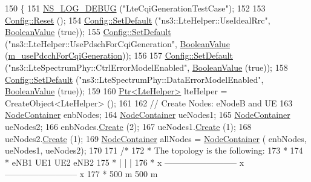 \begin{DoxyCode}
150 \{
151   \hyperlink{group__logging_ga413f1886406d49f59a6a0a89b77b4d0a}{NS\_LOG\_DEBUG} (\textcolor{stringliteral}{"LteCqiGenerationTestCase"});
152 
153   \hyperlink{group__config_ga2c1b65724f42f8c72276d7e7ad6df6db}{Config::Reset} ();
154   \hyperlink{group__config_ga2e7882df849d8ba4aaad31c934c40c06}{Config::SetDefault} (\textcolor{stringliteral}{"ns3::LteHelper::UseIdealRrc"}, 
      \hyperlink{classns3_1_1BooleanValue}{BooleanValue} (\textcolor{keyword}{true}));
155   \hyperlink{group__config_ga2e7882df849d8ba4aaad31c934c40c06}{Config::SetDefault} (\textcolor{stringliteral}{"ns3::LteHelper::UsePdschForCqiGeneration"}, 
      \hyperlink{classns3_1_1BooleanValue}{BooleanValue} (\hyperlink{classLteCqiGenerationTestCase_a12fc45be07ab23b3a9e0805dc867f80c}{m\_usePdcchForCqiGeneration}));
156 
157   \hyperlink{group__config_ga2e7882df849d8ba4aaad31c934c40c06}{Config::SetDefault} (\textcolor{stringliteral}{"ns3::LteSpectrumPhy::CtrlErrorModelEnabled"}, 
      \hyperlink{classns3_1_1BooleanValue}{BooleanValue} (\textcolor{keyword}{true}));
158   \hyperlink{group__config_ga2e7882df849d8ba4aaad31c934c40c06}{Config::SetDefault} (\textcolor{stringliteral}{"ns3::LteSpectrumPhy::DataErrorModelEnabled"}, 
      \hyperlink{classns3_1_1BooleanValue}{BooleanValue} (\textcolor{keyword}{true}));
159 
160   \hyperlink{classns3_1_1Ptr}{Ptr<LteHelper>} lteHelper = CreateObject<LteHelper> ();
161 
162   \textcolor{comment}{// Create Nodes: eNodeB and UE}
163   \hyperlink{classns3_1_1NodeContainer}{NodeContainer} enbNodes;
164   \hyperlink{classns3_1_1NodeContainer}{NodeContainer} ueNodes1;
165   \hyperlink{classns3_1_1NodeContainer}{NodeContainer} ueNodes2;
166   enbNodes.\hyperlink{classns3_1_1NodeContainer_a787f059e2813e8b951cc6914d11dfe69}{Create} (2);
167   ueNodes1.\hyperlink{classns3_1_1NodeContainer_a787f059e2813e8b951cc6914d11dfe69}{Create} (1);
168   ueNodes2.\hyperlink{classns3_1_1NodeContainer_a787f059e2813e8b951cc6914d11dfe69}{Create} (1);
169   \hyperlink{classns3_1_1NodeContainer}{NodeContainer} allNodes = \hyperlink{classns3_1_1NodeContainer}{NodeContainer} ( enbNodes, ueNodes1, ueNodes2);
170 
171   \textcolor{comment}{/*}
172 \textcolor{comment}{   * The topology is the following:}
173 \textcolor{comment}{   *}
174 \textcolor{comment}{   *  eNB1                        UE1 UE2                        eNB2}
175 \textcolor{comment}{   *    |                            |                            |}
176 \textcolor{comment}{   *    x -------------------------- x -------------------------- x}
177 \textcolor{comment}{   *                  500 m                       500 m}

\end{DoxyCode}
